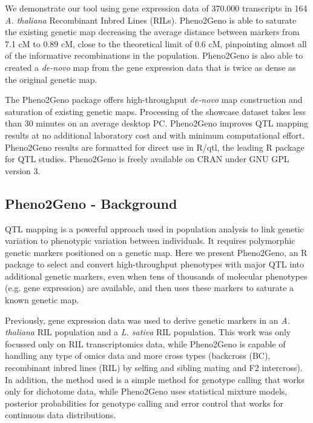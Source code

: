\documentclass[8pt, twoside, a5paper]{report}
\begin{document}
We demonstrate our tool using gene expression data of 370.000 transcripts in 164 \emph{A. thaliana} Recombinant Inbred Lines (RILs). 
Pheno2Geno is able to saturate the existing genetic map decreasing the average distance between markers from 7.1 cM to 0.89 cM, 
close to the theoretical limit of 0.6 cM, pinpointing almost all of the informative recombinations in the population. Pheno2Geno 
is also able to created a \emph{de-novo} map from the gene expression data that is twice as dense as the original genetic map.

The Pheno2Geno package offers high-throughput \emph{de-novo} map construction and saturation of existing genetic maps. 
Processing of the showcase dataset takes less than 30 minutes on an average desktop PC. 
Pheno2Geno improves QTL mapping results at no additional laboratory cost and with minimum computational effort. Pheno2Geno 
results are formatted for direct use in R/qtl, the leading R package for QTL studies. Pheno2Geno is freely available on 
CRAN under GNU GPL version 3.

\subsection{Pheno2Geno - Background}
QTL mapping \cite{Lander:1989} is a powerful approach used in population analysis to link genetic variation to phenotypic 
variation between individuals. It requires polymorphic genetic markers positioned on a genetic map. Here we present Pheno2Geno, 
an R package to select and convert high-throughput phenotypes with major QTL into additional genetic markers, even when tens of 
thousands of molecular phenotypes (e.g. gene expression) are available, and then uses these markers to saturate a known genetic map.

Previously, gene expression data was used to derive genetic markers in an \emph{A. thaliana} RIL population 
\cite{West:2006} and a \emph{L. sativa} RIL population\cite{Truco:2013}. This work was only focussed only on RIL transcriptomics 
data, while Pheno2Geno is capable of handling any type of omics data and more cross types (backcross (BC), recombinant inbred 
lines (RIL) by selfing and sibling mating and F2 intercross). In addition, the method used\cite{West:2006, Truco:2013} is a simple method for 
genotype calling that works only for dichotome data, while Pheno2Geno uses statistical mixture models, posterior probabilities 
for genotype calling and error control that works for continuous data distributions\cite{Jansen:1993, Jansen:2001b}. 
\end{document}
